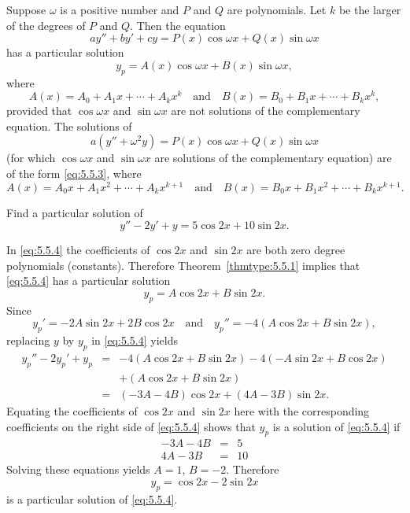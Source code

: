 \documentclass{ximera}
\begin{document}
\begin{theorem}\label{thmtype:5.5.1}
Suppose $\omega$ is a positive number and $P$ and $Q$ are
polynomials. Let $k$ be the larger of the degrees of $P$ and $Q$. Then
the equation
$$
ay''+by'+cy=P(x)\cos \omega x+Q(x)\sin \omega x
$$
has a particular solution
\begin{equation} \label{eq:5.5.3}
y_p=A(x)\cos\omega x+B(x)\sin\omega x,
\end{equation}
where
$$
A(x)=A_0+A_1x+\cdots+A_kx^k\quad \mbox{and}\quad
B(x)=B_0+B_1x+\cdots+B_kx^k,
$$
provided that $\cos\omega x$ and $\sin\omega x$ are
not solutions of  the complementary equation. The solutions of
$$
a(y''+\omega^2y)=P(x)\cos \omega x+Q(x)\sin \omega x
$$
(for which $\cos\omega x$ and $\sin\omega x$ are solutions of the
complementary equation) are of the form \eqref{eq:5.5.3},
where
$$
A(x)=A_0x+A_1x^2+\cdots+A_kx^{k+1}\quad \mbox{and}\quad
B(x)=B_0x+B_1x^2+\cdots+B_kx^{k+1}.
$$
\end{theorem}
 
 
\begin{example}\label{example:5.5.1}
Find a particular solution of
\begin{equation} \label{eq:5.5.4}
y''-2y'+y=5\cos2x+10\sin2x.
\end{equation}
 
 
\begin{explanation}
In \eqref{eq:5.5.4} the coefficients of $\cos2x$ and $\sin2x$ are both zero
degree polynomials (constants). Therefore Theorem~\ref{thmtype:5.5.1}
implies that \eqref{eq:5.5.4} has a particular solution
$$
y_p=A\cos2x+B\sin2x.
$$
Since
$$
y_p'=-2A\sin2x+2B\cos2x\quad\mbox{and}\quad
y_p''=-4(A\cos2x+B\sin2x),
$$
replacing $y$ by $y_p$ in  \eqref{eq:5.5.4} yields
\begin{eqnarray*}
y_p''-2y_p'+y_p&=&-4(A\cos2x+B\sin2x)-4(-A\sin2x+B\cos2x)
\\ &&+(A\cos2x+B\sin2x)\\ &=&
(-3A-4B)\cos2x+(4A-3B)\sin2x.
\end{eqnarray*}
Equating the coefficients of $\cos2x$ and $\sin2x$ here with the
corresponding coefficients on the right side of \eqref{eq:5.5.4}
shows that $y_p$ is a solution of \eqref{eq:5.5.4}  if
\begin{eqnarray*}
-3A-4B&=&5\\
4A-3B&=&10
\end{eqnarray*}
Solving these equations yields $A=1$, $B=-2$.  Therefore
$$
y_p=\cos2x-2\sin2x
$$
is a particular solution of \eqref{eq:5.5.4}.
\end{explanation}
\end{example}
 
\end{document}
